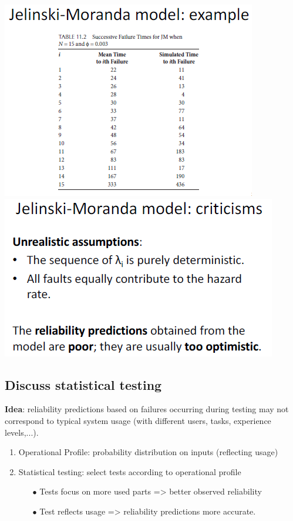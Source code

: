 \documentclass{article}
\begin{document}
\begin{multicols}{2}
\begin{center}
    \includegraphics[scale=0.55]{image/43.PNG}
\includegraphics[scale=0.55]{image/44.PNG}
\end{center}

\end{multicols}

\newpage
\subsection{Discuss statistical testing}
\textbf{Idea}: reliability predictions based on failures occurring during testing may not correspond to typical system usage (with different users, tasks, experience levels,...).
\begin{enumerate}
    \item Operational Profile: probability distribution on inputs (reflecting usage)
    \item Statistical testing: select tests according to operational profile
    \begin{itemize}
        \item [$\bullet$]Tests focus on more used parts => better observed reliability
        \item [$\bullet$]Test reflects usage => reliability predictions more accurate.

    \end{itemize}
\end{enumerate}
\end{document}
